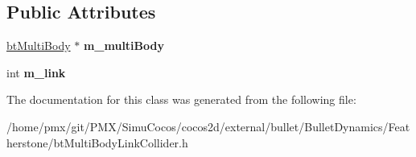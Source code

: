\subsection*{Public Attributes}
\begin{DoxyCompactItemize}
\item 
\mbox{\label{classbtMultiBodyLinkCollider_a340ae2936637e557eca6c38bbfd4befa}} 
\hyperlink{classbtMultiBody}{bt\+Multi\+Body} $\ast$ {\bfseries m\+\_\+multi\+Body}
\item 
\mbox{\label{classbtMultiBodyLinkCollider_a5c6c0438e17774295ef34a2beb5c57c7}} 
int {\bfseries m\+\_\+link}
\end{DoxyCompactItemize}


The documentation for this class was generated from the following file\+:\begin{DoxyCompactItemize}
\item 
/home/pmx/git/\+P\+M\+X/\+Simu\+Cocos/cocos2d/external/bullet/\+Bullet\+Dynamics/\+Featherstone/bt\+Multi\+Body\+Link\+Collider.\+h\end{DoxyCompactItemize}
